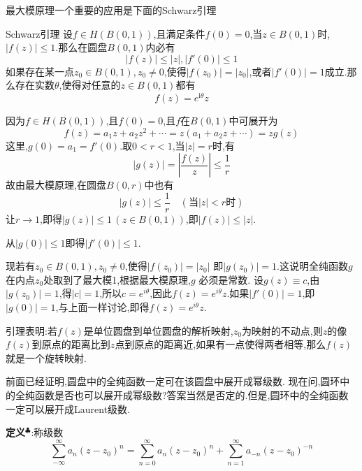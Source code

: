 最大模原理一个重要的应用是下面的Schwarz引理
\begin{Theorem}{Schwarz引理}
    设$f\in H(B(0,1))$,且满足条件$f(0)=0$,当$z\in B(0,1)$时,$|f(z)|\leqslant 1$.那么在圆盘$B(0,1)$内必有
    $$
    |f(z)|\leqslant |z|,|f'(0)|\leqslant 1
    $$
    如果存在某一点$z_0\in B(0,1),z_0\neq 0$,使得$|f(z_0)|=|z_0|$,或者$|f'(0)|=1$成立.那么存在实数$\theta$,使得对任意的$z\in B(0,1)$都有
    $$
    f(z)=e^{\mathrm{i}\theta}z
    $$
\end{Theorem}
\begin{Proof}
因为$f\in H(B(0,1))$,且$f(0)=0$,且$f$在$B(0,1)$中可展开为
$$
f(z)=a_1 z+a_2z^2+\cdots=z(a_1+a_2z+\cdots)=zg(z)
$$
这里,$g(0)=a_1=f'(0)$.取$0<r<1$,当$|z|=r$时,有
$$
|g(z)|=\left|\frac{f(z)}{z}\right|\leqslant\frac{1}{r}
$$
故由最大模原理,在圆盘$B(0,r)$中也有
$$
|g(z)|\leqslant\frac{1}{r}\quad (\text{当}|z|< r\text{时})
$$
让$r\rightarrow 1$,即得$|g(z)|\leqslant 1 \,(z\in B(0,1))$,即$|f(z)|\leqslant|z|$.\par
从$|g(0)|\leqslant 1$即得$|f'(0)|\leqslant 1$.\par
现若有$z_0 \in B(0,1), z_0 \neq 0$,使得$|f(z_0)|=|z_0|$ 即$|g(z_0)|=1$.这说明全纯函数$g$在内点$z_0$处取到了最大模1,根据最大模原理,$g$ 必须是常数.
设$g(z)\equiv c$,由$|g(z_0)| = 1$,得$|c|=1$,所以$c=e^{i\theta}$,因此$f(z)=e^{i\theta}z$.如果$|f'(0)|=1$,即$|g(0)|=1$,与上面一样讨论,即得$f(z)=e^{i\theta}z$.
\end{Proof}
引理表明:若$f(z)$是单位圆盘到单位圆盘的解析映射,$z_0$为映射的不动点,则$z$的像$f(z)$到原点的距离比到$z$点到原点的距离近,如果有一点使得两者相等,那么$f(z)$就是一个旋转映射.\par
前面已经证明,圆盘中的全纯函数一定可在该圆盘中展开成幂级数. 现在问,圆环中的全纯函数是否也可以展开成幂级数?答案当然是否定的.但是,圆环中的全纯函数一定可以展开成Laurent级数.\par
\textbf{定义}$^\clubsuit$:称级数
\begin{equation}
    \sum^{\infty}_{-\infty}a_n (z-z_0)^n=\sum^{\infty}_{n=0}a_n (z-z_0)^n+\sum^{\infty}_{n=1}a_{-n} (z-z_0)^{-n}
    \label{eq:5.1.1}
\end{equation}
